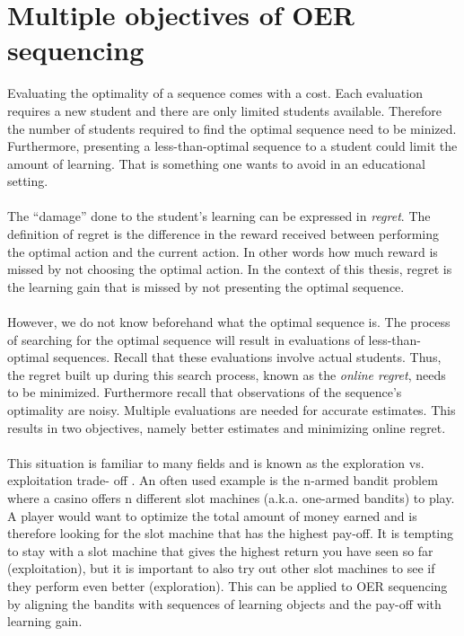 \section{Multiple objectives of OER sequencing}
Evaluating the optimality of a sequence comes with a cost.
Each evaluation requires a new student and there are only limited
students available. Therefore the number of students required to find the
optimal sequence need to be minized. Furthermore, presenting a
less-than-optimal sequence to a student could limit the amount of learning.
That is something one wants to avoid in an educational setting.\\\\
\noindent
The ``damage'' done to the student's learning can be expressed in
\emph{regret}. The definition of regret is the difference in the reward
received between performing the optimal action and the current action. In other
words how much reward is missed by not choosing the optimal action. In the
context of this thesis, regret is the learning gain that is missed by not
presenting the optimal sequence.\\\\
\noindent
However, we do not know beforehand what the optimal sequence is. The process of
searching for the optimal sequence will result in evaluations of
less-than-optimal sequences. Recall that these evaluations involve actual
students. Thus, the regret built up during this search process, known as the
\emph{online regret}, needs to be minimized. Furthermore recall that
observations of the sequence's optimality are noisy. Multiple evaluations are
needed for accurate estimates. This results in two objectives, namely
better estimates and minimizing online regret.\\\\
\noindent
This situation is familiar to many fields and is known as the exploration vs.
exploitation trade- off \citep{Holland1992}. An often used example is the
n-armed bandit problem \citep{Sutton1998} where a casino offers n different
slot machines (a.k.a. one-armed bandits) to play. A player would want to
optimize the total amount of money earned and is therefore looking for the slot
machine that has the highest pay-off. It is tempting to stay with a slot
machine that gives the highest return you have seen so far (exploitation), but
it is important to also try out other slot machines to see if they perform even
better (exploration). This can be applied to OER sequencing by aligning the
bandits with sequences of learning objects and the pay-off with learning gain.
